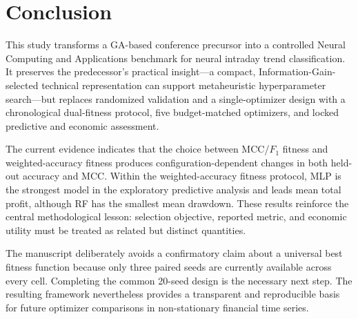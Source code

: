 \section{Conclusion}\label{sec:conclusion}

This study transforms a GA-based conference precursor into a controlled Neural Computing and Applications benchmark for neural intraday trend classification. It preserves the predecessor's practical insight---a compact, Information-Gain-selected technical representation can support metaheuristic hyperparameter search---but replaces randomized validation and a single-optimizer design with a chronological dual-fitness protocol, five budget-matched optimizers, and locked predictive and economic assessment.

The current evidence indicates that the choice between MCC/$F_1$ fitness and weighted-accuracy fitness produces configuration-dependent changes in both held-out accuracy and MCC. Within the weighted-accuracy fitness protocol, MLP is the strongest model in the exploratory predictive analysis and leads mean total profit, although RF has the smallest mean drawdown. These results reinforce the central methodological lesson: selection objective, reported metric, and economic utility must be treated as related but distinct quantities.

The manuscript deliberately avoids a confirmatory claim about a universal best fitness function because only three paired seeds are currently available across every cell. Completing the common 20-seed design is the necessary next step. The resulting framework nevertheless provides a transparent and reproducible basis for future optimizer comparisons in non-stationary financial time series.
